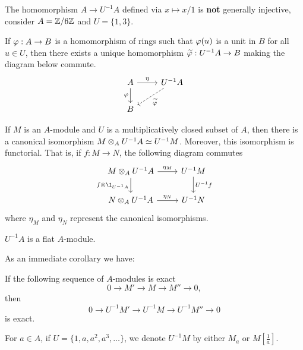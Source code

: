 \documentclass{ximera}
\begin{document}
\begin{warning} The homomorphism $A\to U^{-1}A$ defined via $x\mapsto x/1$ is \textbf{not} generally injective, consider $A = \mathbb Z/6\mathbb Z$ and $U = \{1,3\}$.
\end{warning}


\begin{proposition}
  If $\varphi:A\to B$ is a homomorphism of rings such that $\varphi(u)$ is a
  unit in $B$ for all $u\in U$, then there exists a unique
  homomorphism $\widetilde{\varphi}: U^{-1}A\to B$ making the diagram below
  commute.
  \[
  \begin{tikzcd}
    A \arrow[r,"\eta"] \arrow[d,swap,"\ph"] & U^{-1}A  \arrow[dl,dashed,"\tilde{\ph}"]\\
    B &
  \end{tikzcd}
  \]
\end{proposition}


\begin{proposition}
  If $M$ is an $A$-module and $U$ is a multiplicatively closed subset
  of $A$, then there is a canonical isomorphism $M\otimes_A U^{-1}
  A\simeq U^{-1}M$. Moreover, this isomorphism is functorial. That is,
  if $f:M\to N$, the following diagram commutes
  \[
  \begin{tikzcd}
  M\tensor_A U^{-1}A \arrow[r,"\eta_M"] \arrow[d,swap,"f\tensor \1_{U^{-1}A}"] & U^{-1}M \arrow[d,"U^{-1}f"]\\
  N\tensor_A U^{-1} A \arrow[r,"\eta_N"] & U^{-1}N
  \end{tikzcd}
  \]
  where $\eta_M$  and $\eta_N$ represent the canonical isomorphisms.
\end{proposition}



\begin{proposition} $U^{-1}A$ is a flat $A$-module.
\end{proposition}

As an immediate corollary we have:

\begin{corollary} If the following sequence of $A$-modules is exact
\[
0\to M' \to M \to M'' \to 0,
\]
then
\[
0\to U^{-1}M' \to U^{-1}M \to U^{-1}M'' \to 0
\]
is exact.
\end{corollary}


\begin{definition} For $a\in A$, if $U = \{1,a,a^2,a^3,\dots\}$, we denote $U^{-1}M$ by either $M_a$ or $M[\frac{1}{a}]$.
\end{definition}
\end{document}
